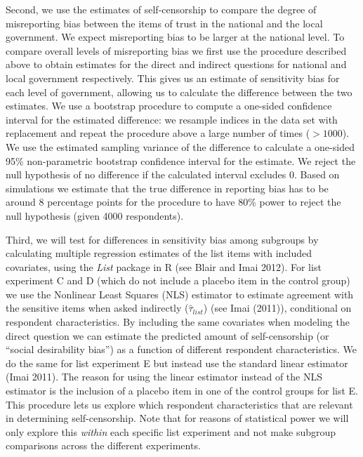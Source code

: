 \documentclass[]{article}
\begin{document}
Second, we use the estimates of self-censorship to compare the degree of
misreporting bias between the items of trust in the national and the
local government. We expect misreporting bias to be larger at the
national level. To compare overall levels of misreporting bias we first
use the procedure described above to obtain estimates for the direct and
indirect questions for national and local government respectively. This
gives us an estimate of sensitivity bias for each level of government,
allowing us to calculate the difference between the two estimates. We
use a bootstrap procedure to compute a one-sided confidence interval for
the estimated difference: we resample indices in the data set with
replacement and repeat the procedure above a large number of times
(\(>1000\)). We use the estimated sampling variance of the difference to
calculate a one-sided 95\% non-parametric bootstrap confidence interval
for the estimate. We reject the null hypothesis of no difference if the
calculated interval excludes 0. Based on simulations we estimate that
the true difference in reporting bias has to be around 8 percentage
points for the procedure to have 80\% power to reject the null
hypothesis (given 4000 respondents).

Third, we will test for differences in sensitivity bias among subgroups
by calculating multiple regression estimates of the list items with
included covariates, using the \emph{List} package in R (see Blair and
Imai 2012). For list experiment C and D (which do not include a placebo
item in the control group) we use the Nonlinear Least Squares (NLS)
estimator to estimate agreement with the sensitive items when asked
indirectly (\(\hat{\tau}_{list}\)) (see Imai (2011)), conditional on
respondent characteristics. By including the same covariates when
modeling the direct question we can estimate the predicted amount of
self-censorship (or ``social desirability bias'') as a function of
different respondent characteristics. We do the same for list experiment
E but instead use the standard linear estimator (Imai 2011). The reason
for using the linear estimator instead of the NLS estimator is the
inclusion of a placebo item in one of the control groups for list E.
This procedure lets us explore which respondent characteristics that are
relevant in determining self-censorship. Note that for reasons of
statistical power we will only explore this \emph{within} each specific
list experiment and not make subgroup comparisons across the different
experiments.

\newpage
\end{document}
